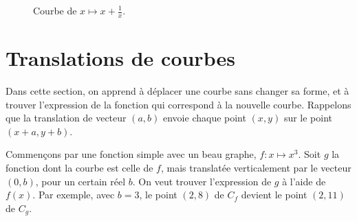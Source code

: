 \documentclass[12pt,a4paper]{article}
\theoremstyle{plain}
\theoremstyle{definition}
\theoremstyle{remark}
\begin{document}
\begin{figure}[htbp]
  \centering
  \begin{minipage}[t]{0.42\linewidth}
    \centering
    \caption{Courbe de $x \mapsto 1/x$.}
    \label{fig:rational_func1}
  \end{minipage}\hfill
  \begin{minipage}[t]{0.42\linewidth}
    \centering
    \caption{Courbe de $x \mapsto x + \frac{1}{x}$.}
    \label{fig:rational_func2}
  \end{minipage}
\end{figure}

\section{Translations de courbes}

Dans cette section, on apprend à déplacer une courbe sans changer sa forme, et à
trouver l'expression de la fonction qui correspond à la nouvelle courbe. Rappelons
que la translation de vecteur $(a, b)$ envoie chaque point $(x, y)$ sur le point
$(x + a, y + b)$.

Commençons par une fonction simple avec un beau graphe, $f : x \mapsto x^3$.
Soit $g$ la fonction dont la courbe est celle de $f$, mais translatée verticalement
par le vecteur $(0, b)$, pour un certain réel $b$. On veut trouver l'expression de
$g$ à l'aide de $f(x)$. Par exemple, avec $b = 3$, le point $(2, 8)$ de $C_f$
devient le point $(2, 11)$ de $C_g$.
\end{document}
